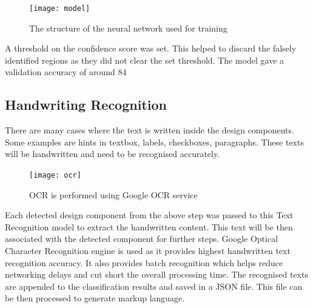       \begin{figure}[H]
        \centering
        \texttt{[image: model]}
        \caption
        {The structure of the neural network used for training}
      \end{figure}

      A threshold on the confidence score was set. This helped to discard the falsely identified regions as they did not clear the set threshold.
      The model gave a validation accuracy of around 84%

      \subsection{ Handwriting Recognition}
        There are many cases where the text is written inside the design components. Some examples are hints in textbox, labels, checkboxes, paragraphs. These texts will be handwritten and need to be recognised accurately.

        \begin{figure}[H]
          \centering
          \texttt{[image: ocr]}
          \caption
          {OCR is performed using Google OCR service}
        \end{figure}

        Each detected design component from the above step was passed to this Text Recognition model to extract the handwritten content. This text will be then associated with the detected component for further steps. Google Optical Character Recognition engine is used as it provides highest handwritten text recognition accuracy. It also provides batch recognition which helps reduce networking delays and cut short the overall processing time.
        The recognised texts are appended to the classification results and saved in a JSON file. This file can be then processed to generate markup language.

